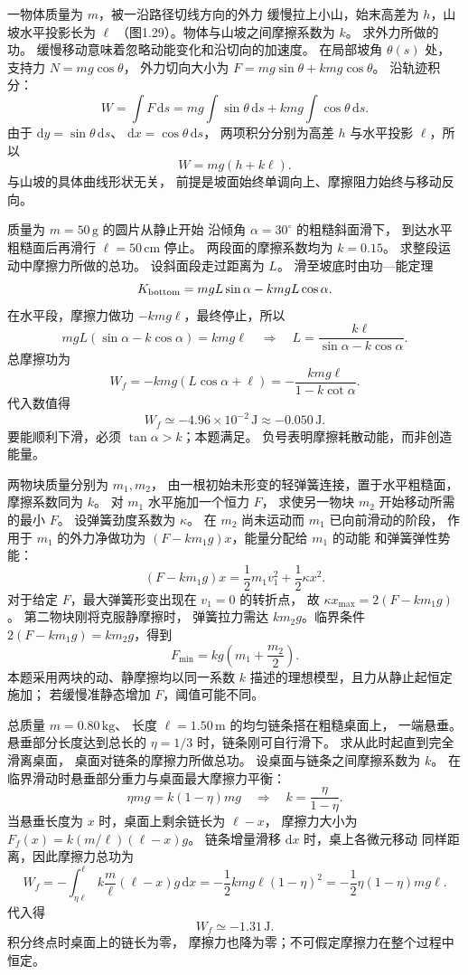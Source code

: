 一物体质量为 $m$，被一沿路径切线方向的外力
缓慢拉上小山，始末高差为 $h$，山坡水平投影长为 $\ell$
（图1.29）。物体与山坡之间摩擦系数为 $k$。
求外力所做的功。
\exsolution
缓慢移动意味着忽略动能变化和沿切向的加速度。
在局部坡角 $\theta(s)$ 处，
支持力 $N=mg\cos\theta$，
外力切向大小为
$F=mg\sin\theta+kmg\cos\theta$。
沿轨迹积分：
\[
W=\int F\,\mathrm ds
=mg\int\sin\theta\,\mathrm ds
+kmg\int\cos\theta\,\mathrm ds.
\]
由于 $\mathrm dy=\sin\theta\,\mathrm ds$、
$\mathrm dx=\cos\theta\,\mathrm ds$，
两项积分分别为高差 $h$ 与水平投影 $\ell$，所以
\[
\boxed{W=mg(h+k\ell)}.
\]
\excheck 与山坡的具体曲线形状无关，
前提是坡面始终单调向上、摩擦阻力始终与移动反向。

质量为 $m=50\,\mathrm g$ 的圆片从静止开始
沿倾角 $\alpha=30^\circ$ 的粗糙斜面滑下，
到达水平粗糙面后再滑行 $\ell=50\,\mathrm{cm}$ 停止。
两段面的摩擦系数均为 $k=0.15$。
求整段运动中摩擦力所做的总功。
\exsolution
设斜面段走过距离为 $L$。
滑至坡底时由功—能定理
\[
K_{\rm bottom}=mgL\sin\alpha-kmgL\cos\alpha.
\]
在水平段，摩擦力做功 $-kmg\ell$，最终停止，所以
\[
mgL(\sin\alpha-k\cos\alpha)=kmg\ell
\quad\Longrightarrow\quad
L=\frac{k\ell}{\sin\alpha-k\cos\alpha}.
\]
总摩擦功为
\[
W_f=-kmg(L\cos\alpha+\ell)
=-\frac{kmg\ell}{1-k\cot\alpha}.
\]
代入数值得
\[
\boxed{W_f\simeq-4.96\times10^{-2}\,\mathrm J
\approx-0.050\,\mathrm J}.
\]
\excheck 要能顺利下滑，必须
$\tan\alpha>k$；本题满足。
负号表明摩擦耗散动能，而非创造能量。

两物块质量分别为 $m_1,m_2$，
由一根初始未形变的轻弹簧连接，置于水平粗糙面，
摩擦系数同为 $k$。
对 $m_1$ 水平施加一个恒力 $F$，
求使另一物块 $m_2$ 开始移动所需的最小 $F$。
\exsolution
设弹簧劲度系数为 $\kappa$。
在 $m_2$ 尚未运动而 $m_1$ 已向前滑动的阶段，
作用于 $m_1$ 的外力净做功为
$(F-km_1g)x$，能量分配给 $m_1$ 的动能
和弹簧弹性势能：
\[
(F-km_1g)x=\frac12m_1v_1^2+\frac12\kappa x^2.
\]
对于给定 $F$，最大弹簧形变出现在 $v_1=0$ 的转折点，
故 $\kappa x_{\max}=2(F-km_1g)$。
第二物块刚将克服静摩擦时，
弹簧拉力需达 $km_2g$。临界条件
$2(F-km_1g)=km_2g$，得到
\[
\boxed{F_{\min}=kg\left(m_1+\frac{m_2}{2}\right)}.
\]
\excheck 本题采用两块的动、静摩擦均以同一系数 $k$
描述的理想模型，且力从静止起恒定施加；
若缓慢准静态增加 $F$，阈值可能不同。

总质量 $m=0.80\,\mathrm{kg}$、
长度 $\ell=1.50\,\mathrm m$ 的均匀链条搭在粗糙桌面上，
一端悬垂。悬垂部分长度达到总长的
$\eta=1/3$ 时，链条刚可自行滑下。
求从此时起直到完全滑离桌面，
桌面对链条的摩擦力所做总功。
\exsolution
设桌面与链条之间摩擦系数为 $k$。
在临界滑动时悬垂部分重力与桌面最大摩擦力平衡：
\[
\eta mg=k(1-\eta)mg
\quad\Longrightarrow\quad
k=\frac{\eta}{1-\eta}.
\]
当悬垂长度为 $x$ 时，桌面上剩余链长为 $\ell-x$，
摩擦力大小为
$F_f(x)=k(m/\ell)(\ell-x)g$。
链条增量滑移 $\mathrm dx$ 时，桌上各微元移动
同样距离，因此摩擦力总功为
\[
W_f=-\int_{\eta\ell}^{\ell}
 k\frac m\ell(\ell-x)g\,\mathrm dx
=-\frac12kmg\ell(1-\eta)^2
=-\frac12\eta(1-\eta)mg\ell .
\]
代入得
\[
\boxed{W_f\simeq-1.31\,\mathrm J}.
\]
\excheck 积分终点时桌面上的链长为零，
摩擦力也降为零；不可假定摩擦力在整个过程中恒定。

